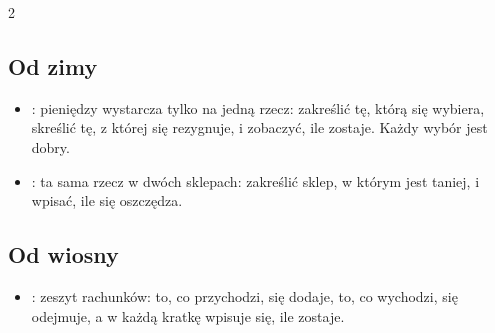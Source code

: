 {\begin{multicols}{2}
\subsection*{Od zimy}
\begin{itemize}[leftmargin=5mm, itemsep=1pt, topsep=0pt]
\item \textbf{\lblElige}: pieniędzy wystarcza tylko na jedną rzecz:
  zakreślić tę, którą się wybiera, skreślić tę, z której się rezygnuje, i
  zobaczyć, ile zostaje. Każdy wybór jest dobry.
\item \textbf{\lblCompara}: ta sama rzecz w dwóch sklepach: zakreślić
  sklep, w którym jest taniej, i wpisać, ile się oszczędza.
\end{itemize}
\subsection*{Od wiosny}
\begin{itemize}[leftmargin=5mm, itemsep=1pt, topsep=0pt]
\item \textbf{\lblCuentas}: zeszyt rachunków: to, co przychodzi, się
  dodaje, to, co wychodzi, się odejmuje, a w każdą kratkę wpisuje się,
  ile zostaje.
\end{itemize}
\end{multicols}}
\newpage
